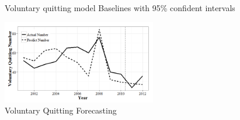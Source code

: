 \documentclass[12pt,letterpaper]{article}
\begin{document}
\begin{table}[htbp]
\begin{threeparttable}
	\end{threeparttable}
	\label{tab:vqparaest}%
\end{table}

\begin{figure}[h!]
	\centering
	\caption{Voluntary quitting model Baselines with 95\% confident intervals}
	\label{fig:vqbasepred}
\end{figure}


\begin{figure}[h!]
	\centering
	\includegraphics[width=0.6\textwidth]{vq.png}
	\caption{Voluntary Quitting Forecasting}
	\label{fig:predictvq}	
	
\end{figure}
\end{document}
